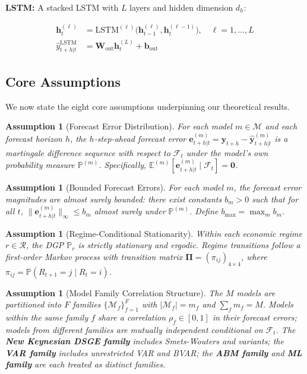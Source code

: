 \documentclass[12pt,a4paper]{article}
\newtheorem{assumption}[theorem]{Assumption}
\begin{document}
\textbf{LSTM:} A stacked LSTM with $L$ layers and hidden dimension $d_h$:

\begin{align}
    \mathbf{h}_t^{(\ell)} &= \text{LSTM}^{(\ell)}\big(
        \mathbf{h}_{t-1}^{(\ell)}, \mathbf{h}_t^{(\ell-1)}\big),
        \quad \ell = 1, \ldots, L \label{eq:lstm} \\
    \hat{y}_{t+h|t}^{\text{LSTM}} &= \mathbf{W}_{\text{out}}
        \mathbf{h}_t^{(L)} + \mathbf{b}_{\text{out}} \nonumber
\end{align}

\subsection{Core Assumptions}

We now state the eight core assumptions underpinning our theoretical
results.

\begin{assumption}[Forecast Error Distribution]
\label{ass:errors}
For each model $m \in \mathcal{M}$ and each forecast horizon $h$, the
$h$-step-ahead forecast error $\mathbf{e}_{t+h|t}^{(m)} = \mathbf{y}_{t+h}
- \hat{\mathbf{y}}_{t+h|t}^{(m)}$ is a martingale difference sequence with
respect to $\mathcal{F}_t$ under the model's own probability measure
$\mathbb{P}^{(m)}$.  Specifically,
$\mathbb{E}^{(m)}[\mathbf{e}_{t+h|t}^{(m)} \mid \mathcal{F}_t] = \mathbf{0}$.
\end{assumption}

\begin{assumption}[Bounded Forecast Errors]
\label{ass:bounded}
For each model $m$, the forecast error magnitudes are almost surely bounded:
there exist constants $b_m > 0$ such that for all $t$,
$\|\mathbf{e}_{t+h|t}^{(m)}\|_\infty \leq b_m$ almost surely under
$\mathbb{P}^{(m)}$.  Define $b_{\max} = \max_m b_m$.
\end{assumption}

\begin{assumption}[Regime-Conditional Stationarity]
\label{ass:regime_stat}
Within each economic regime $r \in \mathcal{R}$, the DGP $\mathbb{P}_r$
is strictly stationary and ergodic.  Regime transitions follow a first-order
Markov process with transition matrix $\mathbf{\Pi} = (\pi_{ij})_{4 \times 4}$,
where $\pi_{ij} = \mathbb{P}(R_{t+1} = j \mid R_t = i)$.
\end{assumption}

\begin{assumption}[Model Family Correlation Structure]
\label{ass:family_corr}
The $M$ models are partitioned into $F$ families
$\{\mathcal{M}_f\}_{f=1}^{F}$ with $|\mathcal{M}_f| = m_f$ and
$\sum_f m_f = M$.  Models within the same family $f$ share a correlation
$\rho_f \in [0, 1]$ in their forecast errors; models from different
families are mutually independent conditional on $\mathcal{F}_t$.
The \textbf{New Keynesian DSGE family} includes Smets-Wouters and
variants; the \textbf{VAR family} includes unrestricted VAR and BVAR;
the \textbf{ABM family} and \textbf{ML family} are each treated as
distinct families.
\end{assumption}
\end{document}

